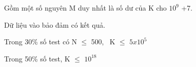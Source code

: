 Gồm một số nguyên M duy nhất là số dư của K cho $10^{9}$ +7.


Dữ liệu vào bảo đảm có kết quả.


Trong 30\% số test có N  $\le$  500,  K  $\le$  $5x10^{5}$


Trong 50\% số test, K  $\le$  $10^{18}$